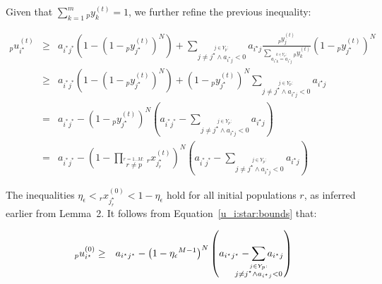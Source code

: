 \documentclass{sig-alt-full}
\def\clap#1{\hbox to 0pt{\hss#1\hss}}
\def\mathclap{\mathpalette\mathclapinternal}
\def\mathclapinternal#1#2{%
	\clap{$\mathsurround=0pt#1{#2}$}}
\newcommand\prodb[2]{\displaystyle\prod_{\stackrel{{#1} :}{#2}}}
\newcommand\sumb[2]{\displaystyle\sum_{\stackrel{{#1} :}{#2}}}
\newcommand\sumd[2]{\sum_{#1}^{#2}}
\newcommand\laxsumb[2]{\displaystyle\sum_{\mathclap{\stackrel{{#1} :}{#2}}}}
\begin{document}
Given that $\sumd{k=1}{m} {_p}y^{(t)}_k = 1$, we further refine the previous inequality:


\noindent\begin{eqnarray}
\nonumber {_p}u^{(t)}_{i^\star} & \geq & a_{i^* j^*} \left( 1 - \left( 1 - {_p}y^{(t)}_{j^\star} \right) ^N \right) + \sumb{j \in Y_{p}}{j \neq j^\star \wedge a_{i^\star j} < 0} { a_{i^\star j} \frac{ {_p}y^{(t)}_j}{ \sumb{k \in Y_{p}}{a_{i^\star k} = a_{i^\star j} } {_p}y^{(t)}_k} \left( 1 - {_p}y^{(t)}_{j^\star} \right)^N }\\
\nonumber & \geq & a_{i^* j^*} \left( 1 - \left( 1 - {_p}y^{(t)}_{j^\star} \right) ^N \right) + \left( 1 - {_p}y^{(t)}_{j^\star} \right)^N \sumb{j \in Y_{p}}{j \neq j^\star \wedge a_{i^\star j} < 0} { a_{i^\star j} }\\
& = & a_{i^* j^*} - \left( 1 - {_p}y^{(t)}_{j^\star} \right) ^N \left( a_{i^* j^*}  - \sumb{j \in Y_{p}}{j \neq j^\star \wedge a_{i^\star j} < 0} { a_{i^\star j} } \right)\\
& = & a_{i^* j^*} - \left( 1 - \prodb{r=1..M}{r \ne p} {_r}x^{(t)}_{j_r^\star} \right) ^N \left( a_{i^* j^*}  - \sumb{j \in Y_{p}}{j \neq j^\star \wedge a_{i^\star j} < 0} { a_{i^\star j} } \right) \label{u_i:star:bounds}
\end{eqnarray}


The inequalities $\eta_\epsilon < {_r}x^{(0)}_{j_r^\star} < 1 - \eta_\epsilon$ hold for all initial populations $r$, as inferred earlier from Lemma~2.  It follows from Equation~\ref{u_i:star:bounds} that:


\noindent\begin{eqnarray}
{_p}u^{(0)}_{i^\star} & \geq & a_{i^\star j^\star} - \left( 1 - {\eta_\epsilon}^{M-1} \right) ^N \left( a_{i^\star j^\star}  - \laxsumb{j \in Y_{p}}{j \neq j^\star \wedge a_{i^\star j} < 0} { a_{i^\star j} } \right) \label{u_i:star:lower:bound}
\end{eqnarray}
\end{document}
